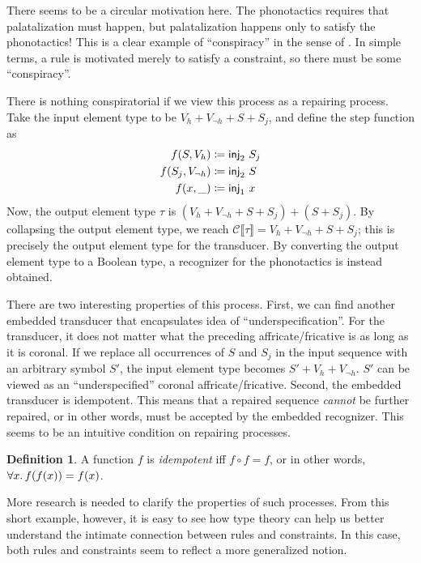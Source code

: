\documentclass[11pt]{article}
\theoremstyle{definition}
\newtheorem{definition}{Definition}
\theoremstyle{plain}
\newcommand{\coloneq}{\mathrel{\vcentcolon\mkern-1.2mu=}}
\newcommand{\hole}{\_}
\newcommand{\metab}[1]{\llbracket#1\rrbracket}
\begin{document}
There seems to be a circular motivation here.  The phonotactics
requires that palatalization must happen, but palatalization happens
only to satisfy the phonotactics!  This is a clear example of
\enquote{conspiracy} in the sense of \citet{k70fupr}.  In simple
terms, a rule is motivated merely to satisfy a constraint, so there
must be some \enquote{conspiracy}.

There is nothing conspiratorial if we view this process as a repairing
process.  Take the input element type to be
\(V_{h} + V_{\neg h} + S + S_{j}\), and define the step function as
%
\begin{align*}
  f(S, V_{h}) &\coloneq \mathsf{inj}_{2}\ S_{j} \\
  f(S_{j}, V_{\neg h}) &\coloneq \mathsf{inj}_{2}\ S \\
  f(x, \hole) &\coloneq \mathsf{inj}_{1}\ x
\end{align*}
%
Now, the output element type \(\tau\) is
\((V_{h} + V_{\neg h} + S + S_{j}) + (S + S_{j})\). By collapsing the
output element type, we reach
\(\mathcal{C}\metab{\tau} = V_{h} + V_{\neg h} + S + S_{j}\);
this is precisely the output element type for the transducer.  By
converting the output element type to a Boolean type, a recognizer for
the phonotactics is instead obtained.

There are two interesting properties of this process.  First, we can
find another embedded transducer that encapsulates 
idea of \enquote{underspecification}.  For the transducer, it does not
matter what the preceding affricate/fricative is as long as it is
coronal.  If we replace all occurrences of \(S\) and \(S_{j}\) in the
input sequence with an arbitrary symbol \(S'\), the input element type
becomes \(S' + V_{h} + V_{\neg h}\).  \(S'\) can be viewed as an
\enquote{underspecified} coronal affricate/fricative.  Second, the
embedded transducer is idempotent.  This means that a repaired
sequence \emph{cannot} be further repaired, or in other words, must be
accepted by the embedded recognizer.  This seems to be an intuitive
condition on repairing processes.

\begin{definition}
  A function \(f\) is \emph{idempotent} iff \(f \circ f = f\), or in
  other words, \(\forall x\ldotp f(f(x)) = f(x)\).
\end{definition}

More research is needed to clarify the properties of such processes.
From this short example, however, it is easy to see how type theory
can help us better understand the intimate connection between rules
and constraints.  In this case, both rules and constraints seem to
reflect a more generalized notion.
\end{document}
